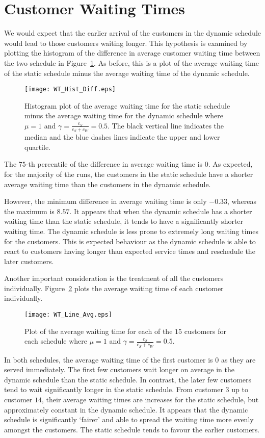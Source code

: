 \section{Customer Waiting Times}
We would expect that the earlier arrival of the customers in the dynamic schedule would lead to those customers waiting longer. This hypothesis is examined by plotting the histogram of the difference in average customer waiting time between the two schedule in Figure~\ref{fig:Diff_Wait}. As before, this is a plot of the average waiting time of the static schedule minus the average waiting time of the dynamic schedule.
\begin{figure}[htb]
	\centering
	\texttt{[image: WT\_Hist\_Diff.eps]}
	\caption{Histogram plot of the average waiting time for the static schedule minus the average waiting time for the dynamic schedule where $\mu = 1$ and $\gamma = \frac{c_{S}}{c_{S} + c_{W}} = 0.5$. The black vertical line indicates the median and the blue dashes lines indicate the upper and lower quartile.}
	\label{fig:Diff_Wait}
\end{figure}

The $75$-th percentile of the difference in average waiting time is $0$. As expected, for the majority of the runs, the customers in the static schedule have a shorter average waiting time than the customers in the dynamic schedule.

However, the minimum difference in average waiting time is only $-0.33$, whereas the maximum is $8.57$. It appears that when the dynamic schedule has a shorter waiting time than the static schedule, it tends to have a significantly shorter waiting time. The dynamic schedule is less prone to extremely long waiting times for the customers. This is expected behaviour as the dynamic schedule is able to react to customers having longer than expected service times and reschedule the later customers.

Another important consideration is the treatment of all the customers individually. Figure~\ref{fig:Avg_Wait_Position} plots the average waiting time of each customer individually.
\begin{figure}[htb]
	\centering
	\texttt{[image: WT\_Line\_Avg.eps]}
	\caption{Plot of the average waiting time for each of the $15$ customers for each schedule where $\mu = 1$ and $\gamma = \frac{c_{S}}{c_{S} + c_{W}} = 0.5$.}
	\label{fig:Avg_Wait_Position}
\end{figure}

In both schedules, the average waiting time of the first customer is $0$ as they are served immediately. The first few customers wait longer on average in the dynamic schedule than the static schedule. In contrast, the later few customers tend to wait significantly longer in the static schedule. From customer $3$ up to customer $14$, their average waiting times are increases for the static schedule, but approximately constant in the dynamic schedule. It appears that the dynamic schedule is significantly `fairer' and able to spread the waiting time more evenly amongst the customers. The static schedule tends to favour the earlier customers.

